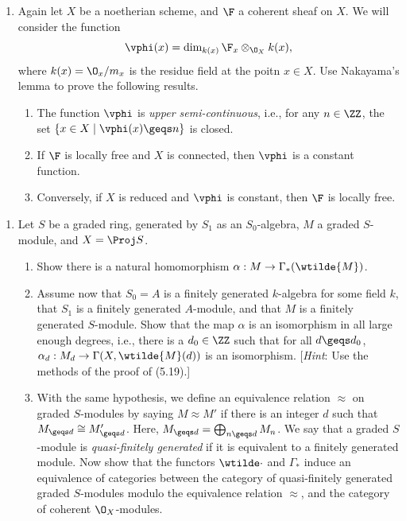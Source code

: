 \documentclass[12pt]{amsart}
\begin{document}

\begin{enumerate}
  \item[5.8.] {
      Again let $X$ be a noetherian scheme, and $\F$ a coherent sheaf on $X$.
      We will consider the function
      \[
        \vphi(x)=\dim_{k(x)}\F_x\otimes_{\O_X}k(x),
      \] 
      where $k(x)=\O_x/m_x$ is the residue field at the poitn $x\in X$.
      Use Nakayama's lemma to prove the following results.
      \begin{enumerate}
        \item The function $\vphi$ is \emph{upper semi-continuous}, i.e., for any $n\in \ZZ$, the set $\{x\in X\mid \vphi(x)\geqs n\}$ is closed.
        \item If $\F$ is locally free and $X$ is connected, then $\vphi$ is a constant function.
        \item Conversely, if $X$ is reduced and $\vphi$ is constant, then $\F$ is locally free.
      \end{enumerate}
    }
\end{enumerate}

\begin{enumerate}
  \item[5.9.] {
      Let $S$ be a graded ring, generated by $S_1$ as an $S_0$-algebra, $M$ a graded $S$-module, and $X=\Proj S$.
      \begin{enumerate}
        \item Show there is a natural homomorphism $\alpha:M\to \Gamma_*(\wtilde{M})$.
        \item Assume now that $S_0=A$ is a finitely generated $k$-algebra for some field $k$, that $S_1$ is a finitely generated $A$-module, and that $M$ is a finitely generated $S$-module.
          Show that the map $\alpha$ is an isomorphism in all large enough degrees, i.e., there is a $d_0\in \ZZ$ such that for all $d\geqs d_0$, $\alpha_d:M_d\to \Gamma(X,\wtilde{M}(d))$ is an isomorphism.
          [\emph{Hint}: Use the methods of the proof of (5.19).]
        \item With the same hypothesis, we define an equivalence relation $\approx$ on graded $S$-modules by saying $M\approx M'$ if there is an integer $d$ such that $M_{\geqs d}\cong M_{\geqs d}'$.
          Here, $M_{\geqs d}=\bigoplus_{n\geqs d}M_n$.
          We say that a graded $S$-module is \emph{quasi-finitely generated} if it is equivalent to a finitely generated module.
          Now show that the functors $\wtilde\cdot$ and $\Gamma_*$ induce an equivalence of categories between the category of quasi-finitely generated graded $S$-modules modulo the equivalence relation $\approx$, and the category of coherent $\O_X$-modules.
      \end{enumerate}
    }
\end{enumerate}
\end{document}
